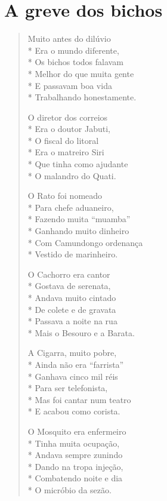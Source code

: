 

\chapter{A greve dos bichos}

\begin{verse}
Muito antes do dilúvio\\*
Era o mundo diferente,\\*
Os bichos todos falavam\\*
Melhor do que muita gente\\*
E passavam boa vida\\*
Trabalhando honestamente.

O diretor dos correios\\*
Era o doutor Jabuti,\\*
O fiscal do litoral\\*
Era o matreiro Siri\\*
Que tinha como ajudante\\*
O malandro do Quati.

O Rato foi nomeado\\*
Para chefe aduaneiro,\\*
Fazendo muita “muamba”\\*
Ganhando muito dinheiro\\*
Com Camundongo ordenança\\*
Vestido de marinheiro.

O Cachorro era cantor\\*
Gostava de serenata,\\*
Andava muito cintado\\*
De colete e de gravata\\*
Passava a noite na rua\\*
Mais o Besouro e a Barata.

A Cigarra, muito pobre,\\*
Ainda não era “farrista”\\*
Ganhava cinco mil réis\\*
Para ser telefonista, \\*
Mas foi cantar num teatro\\*
E acabou como corista.

O Mosquito era enfermeiro\\*
Tinha muita ocupação,\\*
Andava sempre zunindo\\*
Dando na tropa injeção,\\*
Combatendo noite e dia\\*
O micróbio da sezão.


\end{verse}

